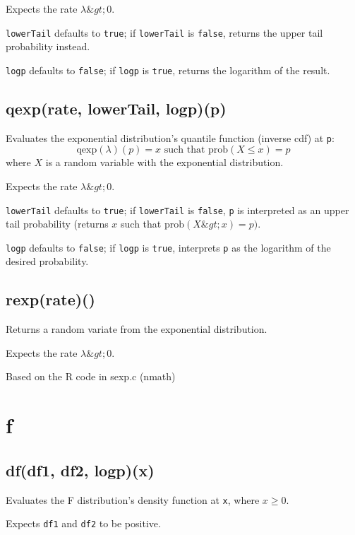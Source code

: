\documentclass{article}
\begin{document}
Expects the rate $\lambda \&gt; 0$.


\texttt{lowerTail} defaults to \texttt{true}; if \texttt{lowerTail} is \texttt{false}, returns
the upper tail probability instead.


\texttt{logp} defaults to \texttt{false}; if \texttt{logp} is \texttt{true}, returns the logarithm
of the result.


    \subsection*{qexp(rate, lowerTail, logp)(p)}
    Evaluates the exponential distribution's quantile function
(inverse cdf) at \texttt{p}:
$$\textrm{qexp}(\lambda)(p) = x \textrm{ such that } \textrm{prob}(X \leq x) = p$$
where $X$ is a random variable with the exponential distribution.


Expects the rate $\lambda \&gt; 0$.


\texttt{lowerTail} defaults to \texttt{true}; if \texttt{lowerTail} is \texttt{false}, \texttt{p} is
interpreted as an upper tail probability (returns
$x$ such that $\textrm{prob}(X \&gt; x) = p)$.


\texttt{logp} defaults to \texttt{false}; if \texttt{logp} is \texttt{true}, interprets \texttt{p} as
the logarithm of the desired probability.


    \subsection*{rexp(rate)()}
    Returns a random variate from the exponential distribution.


Expects the rate $\lambda \&gt; 0$.


Based on the R code in sexp.c (nmath)


  \section{f}
    \subsection*{df(df1, df2, logp)(x)}
    Evaluates the F distribution's density function at \texttt{x}, where
$x \geq 0$.


Expects \texttt{df1} and \texttt{df2} to be positive.
\end{document}
